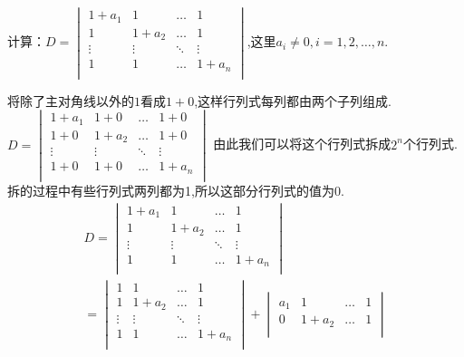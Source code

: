 \begin{examp}{计算：$D=\begin{vmatrix}
1+a_1   &   1   &   \dots   &   1   \\
1   &   1+a_2   &   \dots   &   1   \\
\vdots   &   \vdots   &   \ddots   &   \vdots   \\
1   &   1   &   \dots   &   1+a_n   \\
\end{vmatrix}$,这里$a_i\neq 0,i=1,2,\dots,n$.}
    \par \jie 将除了主对角线以外的$1$看成$1+0$,这样行列式每列都由两个子列组成.$D=
    \begin{vmatrix}
        1+a_1   &   1+0   &   \dots   &   1+0   \\
        1+0   &   1+a_2   &   \dots   &   1+0   \\
        \vdots   &   \vdots   &   \ddots   &   \vdots   \\
        1+0   &   1+0   &   \dots   &   1+a_n   \\
    \end{vmatrix}$
    由此我们可以将这个行列式拆成$2^n$个行列式.拆的过程中有些行列式两列都为1,所以这部分行列式的值为0.
    \begin{gather*}
        D=
        \begin{vmatrix}
            1+a_1   &   1   &   \dots   &   1   \\
            1   &   1+a_2   &   \dots   &   1   \\
            \vdots   &   \vdots   &   \ddots   &   \vdots   \\
            1   &   1   &   \dots   &   1+a_n   \\
        \end{vmatrix}\\
        =\begin{vmatrix}
            1   &   1   &   \dots   &   1   \\
            1   &   1+a_2   &   \dots   &   1   \\
            \vdots   &   \vdots   &   \ddots   &   \vdots   \\
            1   &   1   &   \dots   &   1+a_n   \\
        \end{vmatrix}+
        \begin{vmatrix}
            a_1   &   1   &   \dots   &   1   \\
            0   &   1+a_2   &   \dots   &   1   \\

\end{vmatrix}
\end{gather*}
\end{examp}
